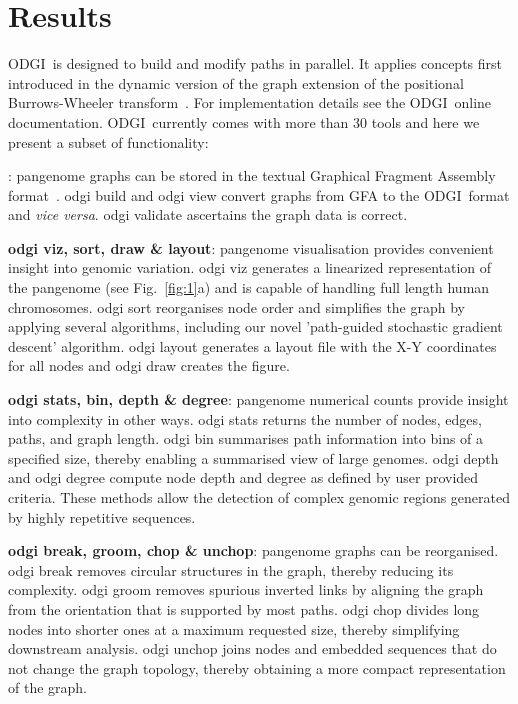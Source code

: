 \documentclass{bioinfo}
\newcommand{\odgi}{ODGI}
\newcommand{\cmd}[1]{\textrm{#1}}
\newcommand{\cmdbf}[1]{{\textbf{#1}}}
\newcommand{\topic}[1]{{\cmdbf{#1}}:}
\begin{document}
    \vspace{-0.15in}

    \section{Results}

    \odgi\ is designed to build and modify paths in parallel. It
    applies concepts first introduced in the dynamic version of the
    graph extension of the positional Burrows-Wheeler
    transform~\citep{Siren:2020}. For implementation details see the
    \odgi\ online documentation. \odgi\ currently comes with more than 30
    tools and here we present a subset of functionality:

    \indent \topic{odgi build, view \& validate} pangenome graphs can be
    stored in the textual Graphical Fragment Assembly
    format~\citep{GFA}. \cmd{odgi build} and \cmd{odgi view}
    convert graphs from GFA to the \odgi\ format and \textit{vice versa}.
    \cmd{odgi validate} ascertains the graph data is correct.

    \topic{odgi viz, sort, draw \& layout} pangenome visualisation
    provides convenient insight into genomic variation. \cmd{odgi viz}
    generates a linearized representation of the pangenome (see Fig.~\ref{fig:1}a)
    and is capable of handling full length human chromosomes. \cmd{odgi sort}
    reorganises node order and simplifies the graph by applying several
    algorithms, including our novel 'path-guided stochastic gradient descent'
    algorithm. \cmd{odgi layout} generates a layout file with the X-Y
    coordinates for all nodes and \cmd{odgi draw} creates the figure.

    \topic{odgi stats, bin, depth \& degree} pangenome numerical
    counts provide insight into complexity in other
    ways. \cmd{odgi stats} returns the number of nodes,
    edges, paths, and graph length. \cmd{odgi bin} summarises path
    information into bins of a specified size, thereby enabling a
    summarised view of large genomes. \cmd{odgi depth} and
    \cmd{odgi degree} compute node depth and degree as defined by
    user provided criteria. These methods allow the detection of complex
    genomic regions generated by highly repetitive sequences.

    \topic{odgi break, groom, chop \& unchop} pangenome graphs can be
    reorganised. \cmd{odgi break} removes circular structures in the
    graph, thereby reducing its complexity. \cmd{odgi groom} removes
    spurious inverted links by aligning the graph from the orientation
    that is supported by most paths. \cmd{odgi chop} divides long
    nodes into shorter ones at a maximum requested size, thereby
    simplifying downstream analysis. \cmd{odgi unchop} joins nodes
    and embedded sequences that do not change the graph topology,
    thereby obtaining a more compact representation of the graph.
\end{document}
